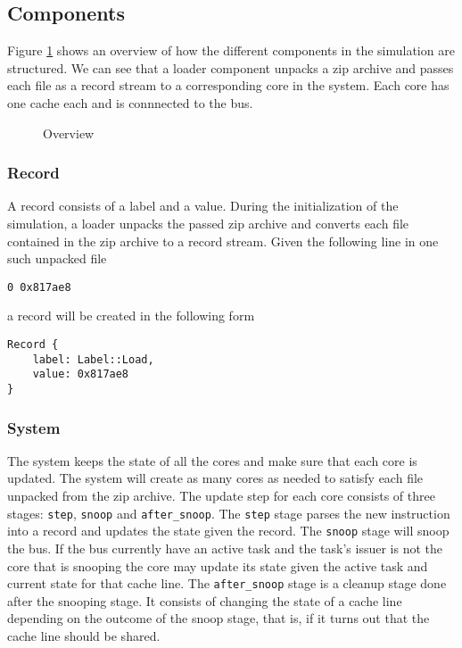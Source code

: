 
\subsection{Components}
Figure \ref{fig:overview} shows an overview of how the different components in the simulation are structured. We can see that a loader component unpacks a zip archive and passes each file as a record stream to a corresponding core in the system. Each core has one cache each and is connnected to the bus.

\begin{figure}[ht]
    \centering
    \caption{Overview}
    \label{fig:overview}
\end{figure}



\subsubsection{Record}

A record consists of a label and a value. 
During the initialization of the simulation, a loader unpacks the passed zip archive and converts each file contained in the zip archive to a record stream.
Given the following line in one such unpacked file
\begin{lstlisting}
0 0x817ae8
\end{lstlisting}
a record will be created in the following form
\begin{lstlisting}
Record {
    label: Label::Load,
    value: 0x817ae8
}
\end{lstlisting}


\subsubsection{System}
The system keeps the state of all the cores and make sure that each core is updated.
The system will create as many cores as needed to satisfy each file unpacked from the zip archive.
The update step for each core consists of three stages: \texttt{step}, \texttt{snoop} and \texttt{after\_snoop}.
The \texttt{step} stage parses the new instruction into a record and updates the state given the record.
The \texttt{snoop} stage will snoop the bus.
If the bus currently have an active task and the task's issuer is not the core that is snooping the core may update its state given the active task and current state for that cache line.
The \texttt{after\_snoop} stage is a cleanup stage done after the snooping stage.
It consists of changing the state of a cache line depending on the outcome of the snoop stage, that is, if it turns out that the cache line should be shared. 

